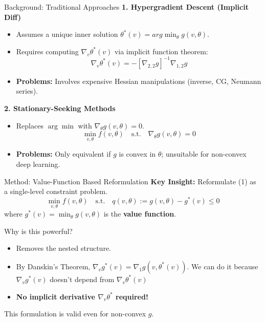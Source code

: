 \documentclass{beamer}
\begin{document}
\begin{frame}{Background: Traditional Approaches}
    \textbf{1. Hypergradient Descent (Implicit Diff)}
    \begin{itemize}
        \item Assumes a unique inner solution $\theta^*(v)= arg \min_{\theta} g(v, \theta)$.
        \item Requires computing $\nabla_v \theta^*(v)$ via implicit function theorem:
        \begin{equation*}
            \nabla_v \theta^*(v) = - [\nabla_{2,2}g]^{-1} \nabla_{1,2}g
        \end{equation*}
        \item \textbf{Problems:} Involves expensive Hessian manipulations (inverse, CG, Neumann series).
    \end{itemize}
    \vspace{0.3cm}
    \textbf{2. Stationary-Seeking Methods}
    \begin{itemize}
        \item Replaces $\arg\min$ with $\nabla_\theta g(v,\theta)=0$.
        \begin{equation*}
            \min_{v,\theta} f(v,\theta) \quad \text{s.t.} \quad \nabla_\theta g(v,\theta)=0
        \end{equation*}
        \item \textbf{Problems:} Only equivalent if $g$ is convex in $\theta$; unsuitable for non-convex deep learning.
    \end{itemize}
\end{frame}

\begin{frame}{Method: Value-Function Based Reformulation}
    \textbf{Key Insight:} Reformulate (1) as a single-level constraint problem.
    \begin{equation*}
        \min_{v,\theta} f(v,\theta) \quad \text{s.t.} \quad q(v,\theta) := g(v,\theta) - g^*(v) \leq 0
    \end{equation*}
    where $g^*(v) = \min_\theta g(v,\theta)$ is the \textbf{value function}.

    \begin{block}{Why is this powerful?}
        \begin{itemize}
            \item Removes the nested structure.
            \item By Danskin's Theorem, $\nabla_v g^*(v) = \nabla_1 g(v, \theta^*(v))$. We can do it because $\nabla_v g^*(v)$ doesn't depend from $\nabla_v \theta^*(v)$
            \item \textbf{No implicit derivative $\nabla_v\theta^*$ required!}
        \end{itemize}
    \end{block}
    This formulation is valid even for non-convex $g$.
\end{frame}
\end{document}
